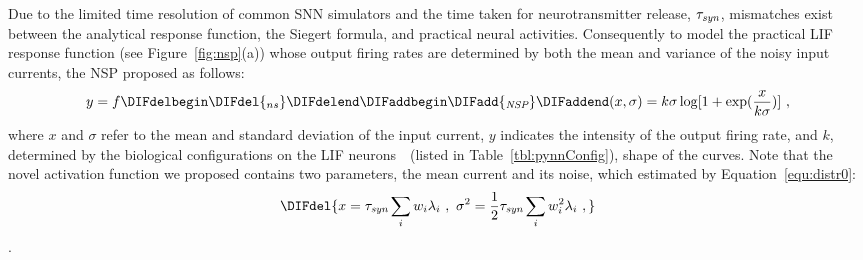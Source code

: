 	Due to the limited time resolution of common SNN simulators and the time taken for neurotransmitter release, $\tau_{\textit{\textrm{syn}}}$, mismatches exist between the analytical response function, the Siegert formula, and practical neural activities.
	Consequently to model the practical LIF response function (see Figure~\ref{fig:nsp}(a)) whose output firing rates are determined by both the mean and variance of the noisy input currents, the NSP \DIFdelbegin {}\DIFdelend \DIFaddbegin {}\DIFaddend proposed as follows:
	\begin{equation}
	y = f\DIFdelbegin \DIFdel{_{ns}}\DIFdelend \DIFaddbegin \DIFadd{_{\textit{\textrm{NSP}}}}\DIFaddend (x, \sigma) = k \sigma \log [1 + \exp(\frac{x}{k \sigma})]~,
	\label{equ:nsp}
	\end{equation}
	where $x$ and $\sigma$ refer to the mean and standard deviation of the input current, $y$ indicates the intensity of the output firing rate, and $k$, determined by the biological configurations on the LIF neurons~\citep{liu2016noisy}~(listed in Table~\ref{tbl:pynnConfig}), \DIFdelbegin {}\DIFdelend \DIFaddbegin {}\DIFaddend shape of the curves.
	Note that the novel activation function we proposed contains two parameters, the mean current and its noise, which \DIFdelbegin {}\DIFdelend \DIFaddbegin {}\DIFaddend estimated by Equation~\ref{equ:distr0}: \DIFdelbegin \begin{displaymath}
	\DIFdel{x = \tau_{\textit{\textrm{syn}}}\sum_i w_i\lambda_{i}~, ~\sigma^2=\frac{1}{2}\tau_{\textit{\textrm{syn}}}\sum_i w_i^2\lambda_{i}~,
	}\end{displaymath}
\DIFdelend \DIFaddbegin {}\DIFaddend .
	\DIFaddbegin {}\DIFaddend 

